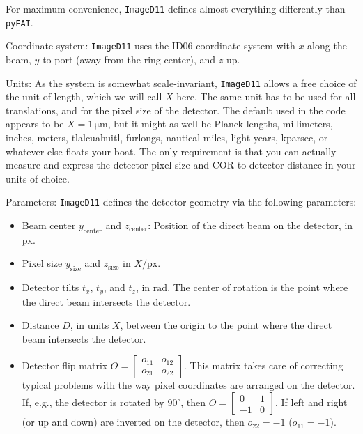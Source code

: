 \documentclass[12pt]{article}
\begin{document}
For maximum convenience, \texttt{ImageD11} defines almost everything
differently than \texttt{pyFAI}.

Coordinate system: \texttt{ImageD11} uses the ID06 coordinate system
with $x$ along the beam, $y$ to port (away from the ring center), and
$z$ up.

Units: As the system is somewhat scale-invariant, \texttt{ImageD11}
allows a free choice of the unit of length, which we will call $X$
here. The same unit has to be used for all translations, and for the
pixel size of the detector. The default used in the code appears to be
$X = 1\,\mathrm{\mu m}$, but it might as well be Planck lengths,
millimeters, inches, meters, tlalcuahuitl, furlongs, nautical miles,
light years, kparsec, or whatever else floats your boat. The only
requirement is that you can actually measure and express the detector
pixel size and COR-to-detector distance in your units of choice.

Parameters: \texttt{ImageD11} defines the detector geometry via the
following parameters:

\begin{itemize}
\item Beam center $y_{\mathrm{center}}$ and $z_{\mathrm{center}}$:
  Position of the direct beam on the detector, in $\mathrm{px}$.
\item Pixel size $y_{\mathrm{size}}$ and $z_{\mathrm{size}}$ in
  ${X}/{\mathrm{px}}$.
\item Detector tilts $t_x$, $t_y$, and $t_z$, in $\mathrm{rad}$. The
  center of rotation is the point where the direct beam intersects the
  detector.
\item Distance $D$, in units $X$, between the origin to the point
  where the direct beam intersects the detector.
\item Detector flip matrix $O = \begin{bmatrix} o_{11} & o_{12}
  \\ o_{21} & o_{22} \end{bmatrix}$. This matrix takes care of
  correcting typical problems with the way pixel coordinates are
  arranged on the detector. If, e.g., the detector is rotated by
  $90^{\circ}$, then $O=\begin{bmatrix} 0 & 1 \\ -1 &
  0\end{bmatrix}$. If left and right (or up and down) are inverted on the
  detector, then $o_{22} = -1$ ($o_{11}=-1$). 
\end{itemize}
\end{document}
